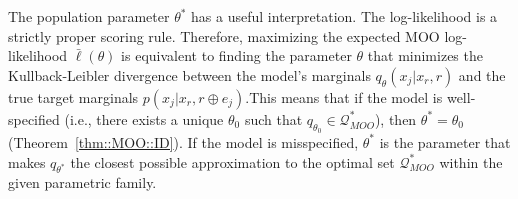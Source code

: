 \documentclass[aos, preprint]{imsart}
\theoremstyle{plain}
\theoremstyle{definition}
\let\hat\widehat
\newcommand{\E}{\mbox{$\mathbb{E}$}}
\newcommand{\bX}{\mathbf{X}}
\newcommand{\bR}{\mathbf{R}}
\begin{document}
The population parameter $\theta^*$ has a useful interpretation. The log-likelihood is a strictly proper scoring rule. Therefore, maximizing the expected MOO log-likelihood $\bar \ell(\theta)$ is equivalent to finding the parameter $\theta$ that minimizes the Kullback-Leibler divergence between the model's marginals $q_\theta(x_j|x_r, r)$ and the true target marginals $p(x_j|x_r, r\oplus e_j)$.This means that if the model is well-specified (i.e., there exists a unique $\theta_0$ such that $q_{\theta_0} \in \mathcal{Q}^*_{MOO}$), then $\theta^* = \theta_0$ (Theorem~\ref{thm::MOO::ID}). If the model is misspecified, $\theta^*$ is the parameter that makes $q_{\theta^*}$ the closest possible approximation to the optimal set $\mathcal{Q}^*_{MOO}$ within the given parametric family. 

\end{document}
